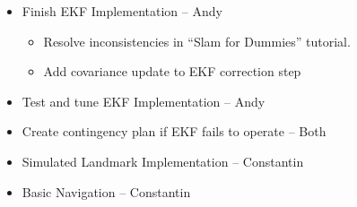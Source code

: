 \documentclass[12pt]{article}
\begin{document}
\begin{itemize}
    \setlength{\itemsep}{0pt}
    \setlength{\parskip}{0pt}
    \setlength{\parsep}{0pt}
    \item Finish EKF Implementation -- Andy
      \begin{itemize}
            \setlength{\itemsep}{0pt}
            \setlength{\parskip}{0pt}
            \setlength{\parsep}{0pt}
            \item Resolve inconsistencies in ``Slam for Dummies'' tutorial.
            \item Add covariance update to EKF correction step
      \end{itemize}
    \item Test and tune EKF Implementation -- Andy
    \item Create contingency plan if EKF fails to operate -- Both
    \item Simulated Landmark Implementation -- Constantin
    \item Basic Navigation -- Constantin
\end{itemize}
\end{document}
